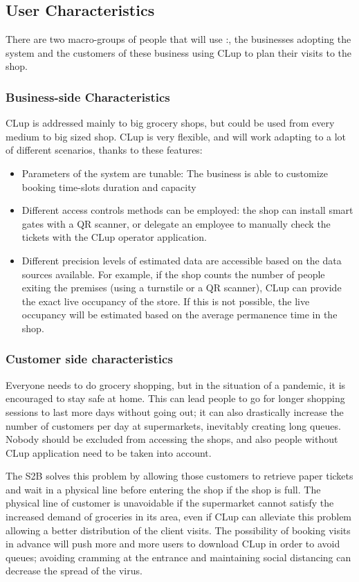 \subsection{User Characteristics}
There are two macro-groups of people that will use :, the businesses adopting the system and the customers of these business using CLup to plan their visits to the shop.

\subsubsection{Business-side Characteristics}
CLup is addressed mainly to big grocery shops, but could be used from every medium to big sized shop.
CLup is very flexible, and will work adapting to a lot of different scenarios, thanks to these features:
\begin{itemize}
    \item Parameters of the system are tunable: The business is able to customize booking time-slots duration and capacity
    \item Different access controls methods can be employed: the shop can install smart gates with a QR scanner, or delegate an employee to manually check the tickets with the CLup operator application.
    \item Different precision levels of estimated data are accessible based on the data sources available. For example, if the shop counts the number of people exiting the premises (using a turnstile or a QR scanner), CLup can provide the exact live occupancy of the store. If this is not possible, the live occupancy will be estimated based on the average permanence time in the shop.

\end{itemize}
\subsubsection{Customer side characteristics}
Everyone needs to do grocery shopping, but in the situation of a pandemic, it is encouraged to stay safe at home. This can lead people to go for longer shopping sessions to last more days without going out; it can also drastically increase the number of customers per day at supermarkets, inevitably creating long queues.
Nobody should be excluded from accessing the shops, and also people without CLup application need to be taken into account.


The S2B solves this problem by allowing those customers to retrieve paper tickets and wait in a physical line before entering the shop if the shop is full.
The physical line of customer is unavoidable if the supermarket cannot satisfy the increased demand of groceries in its area, even if CLup can alleviate this problem allowing a better distribution of the client visits. The possibility of booking visits in advance will push more and more users to download CLup in order to avoid queues; avoiding cramming at the entrance and maintaining social distancing can decrease the spread of the virus.

